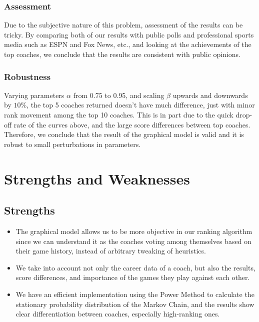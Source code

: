 \documentclass[11pt,notitlepage]{article}
\begin{document}
\subsubsection*{Assessment}

\noindent Due to the subjective nature of this problem, assessment of the results can be tricky. By comparing both of our results with public polls and professional sports media such as ESPN and Fox News, etc., and looking at the achievements of the top coaches, we conclude that the results are consistent with public opinions.

\subsubsection*{Robustness}

\noindent Varying parameters $\alpha$ from 0.75 to 0.95, and scaling $\beta$ upwards and downwards by $10\%$, the top 5 coaches returned doesn't have much difference, just with minor rank movement among the top 10 coaches. This is in part due to the quick drop-off rate of the curves above, and the large score differences between top coaches. Therefore, we conclude that the result of the graphical model is valid and it is robust to small perturbations in parameters.

\section{Strengths and Weaknesses}

\subsection{Strengths}
\begin{itemize}
\item The graphical model allows us to be more objective in our ranking algorithm since we can understand it as the coaches voting among themselves based on their game history, instead of arbitrary tweaking of heuristics.

\item We take into account not only the career data of a coach, but also the results, score differences, and importance of the games they play against each other.

\item We have an efficient implementation using the Power Method to calculate the stationary probability distribution of the Markov Chain, and the results show clear differentiation between coaches, especially high-ranking ones.
\end{itemize}
\end{document}
